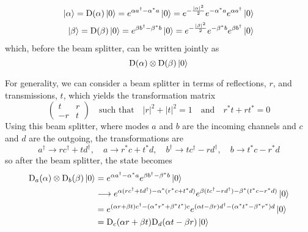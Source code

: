 \begin{equation}
\begin{split}
	\ket{\alpha} = \text{D}(\alpha)\ket{0} = e^{\alpha a^\dagger - \alpha^\ast a}\ket{0} = e^{-\frac{|\alpha|^2}{2}} e^{-\alpha^\ast a} e^{\alpha a^\dagger}\ket{0}\\
	\ket{\beta} = \text{D}(\beta)\ket{0} = e^{\beta b^\dagger - \beta^\ast b}\ket{0} = e^{-\frac{|\beta|^2}{2}} e^{-\beta^\ast b} e^{\beta b^\dagger}\ket{0}
\end{split}
\end{equation}
which, before the beam splitter, can be written jointly as
\begin{equation}
	\text{D}(\alpha)\otimes\text{D}(\beta)\ket{0}
\end{equation}

For generality, we can consider a beam splitter in terms of reflections, $r$, and transmissions, $t$, which yields the transformation matrix
\begin{equation}
	\left(
	\begin{matrix}
		t & r \\
		-r & t
	\end{matrix}
	\right)
	\quad\text{such that}\quad
	|r|^2 + |t|^2 = 1 
	\quad\text{and}\quad
	r^\ast t + r t^\ast = 0
\end{equation}
Using this beam splitter, where modes $a$ and $b$ are the incoming channels and $c$ and $d$ are the outgoing, the transformations are
\begin{equation}
	a^\dagger \rightarrow rc^\dagger + td^\dagger, \quad a \rightarrow r^\ast c + t^\ast d, \quad b^\dagger \rightarrow tc^\dagger - rd^\dagger, \quad b \rightarrow t^\ast c - r^\ast d
\end{equation}
so after the beam splitter, the state becomes
\begin{align}
	\text{D}_a(\alpha)\otimes\text{D}_b(\beta)\ket{0} &=  e^{\alpha a^\dagger - \alpha^\ast a} e^{\beta b^\dagger - \beta^\ast b}\ket{0}\\
	&\longrightarrow  e^{\alpha (r c^\dagger + t d^\dagger) - \alpha^\ast (r^\ast c + t^\ast d)}e^{\beta (t c^\dagger - r d^\dagger) - \beta^\ast (t^\ast c - r^\ast d)}\ket{0}\\
	&=  e^{(\alpha r + \beta t) c^\dagger - (\alpha^\ast r^\ast + \beta^\ast t^\ast) c} e^{(\alpha t - \beta r) d^\dagger - (\alpha^\ast t^\ast - \beta^\ast r^\ast) d}\ket{0}\\
	&=  \text{D}_c(\alpha r + \beta t)\text{D}_d(\alpha t - \beta r)\ket{0}
\end{align}

